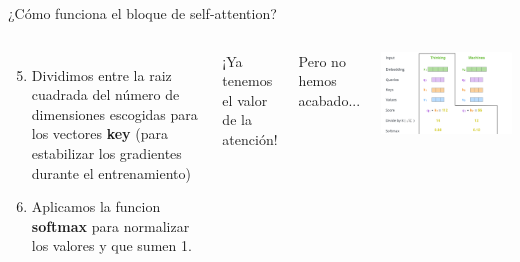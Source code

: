 \begin{frame}{¿Cómo funciona el bloque de self-attention?}

\begin{columns}
\begin{enumerate}
\setcounter{enumi}{4}
    \item Dividimos entre la raiz cuadrada del número de dimensiones escogidas para los vectores \textbf{key} (para estabilizar los gradientes durante el entrenamiento)
    \item Aplicamos la funcion \textbf{softmax} para normalizar los valores y que sumen 1.
\end{enumerate}
\vspace{1em}
¡Ya tenemos el valor de la atención!

Pero no hemos acabado...

\includegraphics[width=\textwidth]{Slides/figures/02_Metodos_Generativos/trans-att4.png}

\end{columns}
\end{frame}

